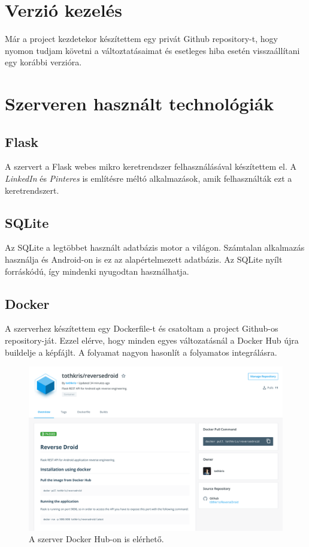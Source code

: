 \documentclass{thesis-ekf}
\theoremstyle{definition}
\theoremstyle{remark}
\begin{document}
\section{Verzió kezelés}

Már a project kezdetekor készítettem egy privát Github repository-t, hogy nyomon tudjam követni a változtatásaimat és esetleges hiba esetén visszaállítani egy korábbi verzióra.


\section{Szerveren használt technológiák}

\subsection{Flask}

A szervert a Flask webes mikro keretrendszer felhasználásával készítettem el.
A \emph{LinkedIn} és \emph{Pinteres} is említésre méltó alkalmazások, amik felhasználták ezt a keretrendszert.

\subsection{SQLite}

Az SQLite a legtöbbet használt adatbázis motor a világon. 
Számtalan alkalmazás használja és Android-on is ez az alapértelmezett adatbázis.
Az SQLite nyílt forráskódú, így mindenki nyugodtan használhatja.

\subsection{Docker}\label{docker}

A szerverhez készítettem egy Dockerfile-t és csatoltam a project Github-os repository-ját.
Ezzel elérve, hogy minden egyes változatásnál a Docker Hub újra buildelje a képfájlt.
A folyamat nagyon hasonlít a folyamatos integrálásra.

\begin{figure}[!h]
	\centering
	\includegraphics[width=15cm]{kepek/docker_hub}
	\caption{A szerver Docker Hub-on is elérhető.}
	\label{dockerhub}
\end{figure}
\end{document}
